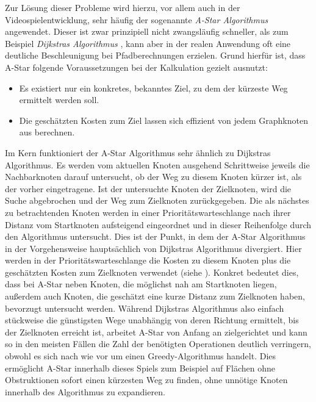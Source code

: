 Zur Lösung dieser Probleme wird hierzu, vor allem auch in der Videospielentwicklung, sehr häufig der sogenannte \textit{A-Star Algorithmus} \cite{A_Star_Paper} angewendet. Dieser ist zwar prinzipiell nicht zwangs\-läu\-fig schneller, als zum Beispiel \textit{Dijkstras Algorithmus} \cite[658]{cormen}, kann aber in der realen Anwendung oft eine deutliche Beschleunigung bei Pfadberechnungen erzielen. Grund hierfür ist, dass A-Star folgende Voraussetzungen bei der Kalkulation gezielt ausnutzt:
\begin{itemize}
	\item Es existiert nur ein konkretes, bekanntes Ziel, zu dem der kürzeste Weg ermittelt werden soll.
	\item Die geschätzten Kosten zum Ziel lassen sich effizient von jedem Graphknoten aus berechnen.
\end{itemize}
Im Kern funktioniert der A-Star Algorithmus sehr ähnlich zu Dijkstras Algorithmus. Es werden vom aktuellen Knoten ausgehend Schrittweise jeweils die Nachbarknoten darauf untersucht, ob der Weg zu diesem Knoten kürzer ist, als der vorher eingetragene. Ist der untersuchte Knoten der Zielknoten, wird die Suche abgebrochen und der Weg zum Zielknoten zurückgegeben. Die als nächstes zu betrachtenden Knoten werden in einer Prioritätswarteschlange nach ihrer Distanz vom Startknoten aufsteigend eingeordnet und in dieser Reihenfolge durch den Algorithmus untersucht. Dies ist der Punkt, in dem der A-Star Algorithmus in der Vorgehensweise hauptsächlich von Dijkstras Algorithmus divergiert. Hier werden in der Prioritätswarteschlange die Kosten zu diesem Knoten plus die geschätzten Kosten zum Zielknoten verwendet (siehe \cite[S. 102]{A_Star_Paper}). Konkret bedeutet dies, dass bei A-Star neben Knoten, die möglichst nah am Startknoten liegen, außerdem auch Knoten, die geschätzt eine kurze Distanz zum Zielknoten haben, bevorzugt untersucht werden. Während Dijkstras Algorithmus also einfach stückweise die günstigsten Wege unabhängig von deren Richtung ermittelt, bis der Zielknoten erreicht ist, arbeitet A-Star von Anfang an zielgerichtet und kann so in den meisten Fällen die Zahl der benötigten Operationen deutlich verringern, obwohl es sich nach wie vor um einen Greedy-Algorithmus handelt. Dies ermöglicht A-Star innerhalb dieses Spiels zum Beispiel auf Flächen ohne Obstruktionen sofort einen kürzesten Weg zu finden, ohne unnötige Knoten innerhalb des Algorithmus zu expandieren.

